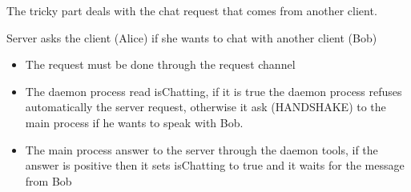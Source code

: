 \documentclass[11pt]{report}
\begin{document}
\noindent The tricky part deals with the chat request that comes from another client.

\vspace{0.5cm}


\noindent Server asks the client (Alice) if she wants to chat with another client (Bob)

\begin{itemize}
	\item The request must be done through the request channel
	\item The daemon process read isChatting, if it is true the daemon process refuses automatically the server request, otherwise it ask (HANDSHAKE) to the main process if he wants to speak with Bob. 
	\item The main process answer to the server through the daemon tools, if the answer is positive then it sets isChatting to true and it waits for the message from Bob
\end{itemize}
\end{document}
